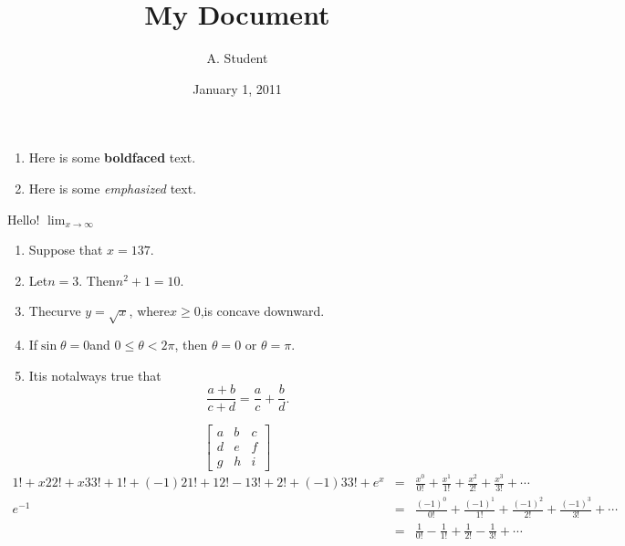 \documentclass{article}
\title{My Document}
\author{A. Student}
\date{January 1, 2011}
\begin{document}
 \maketitle
 \begin{enumerate}
 \item Here is some \textbf{boldfaced} text.
 \item Here is some \emph{emphasized} text.
 \end{enumerate}
 
 {\Large Hello!}
  $\lim_{x \rightarrow \infty}$
   \begin{enumerate}
 \item Suppose that $x=137$.
 \item Let$n=3$. Then$n^2+1=10$.
 \item Thecurve $y= \sqrt{x}$, where$x \geq 0$,is concave downward.
 \item If$\sin \theta = 0$and $0\leq \theta <2\pi$,
 then $\theta=0$ or $\theta=\pi$.
 \item Itis notalways true that
 \[\frac{a+b}{c+d}=\frac{a}{c}+\frac{b}{d}.\]
 \end{enumerate}
 \[
 \left[
 \begin{array}{ccc}
 a & b & c\\
 d & e & f\\
 g & h & i
 \end{array}
 \right]
 \]
 \begin{eqnarray*}
 1! + x2
 2! + x3
 3! +
 1! + (−1)2
 1! + 1
 2! − 1
 3! +
 2! + (−1)3
 3! +
 e^x & = & \frac{x^0}{0!}+\frac{x^1}{1!}
 +\frac{x^2}{2!}+\frac{x^3}{3!}+\cdots\\
 e^{-1} & = & \frac{{(-1)}^0}{0!}+\frac{{(-1)}^1}{1!}
 +\frac{{(-1)}^2}{2!}+\frac{{(-1)}^3}{3!}+\cdots\\
 & = & \frac{1}{0!}-\frac{1}{1!}+\frac{1}{2!}-\frac{1}{3!}+\cdots
 \end{eqnarray*}
\end{document}
